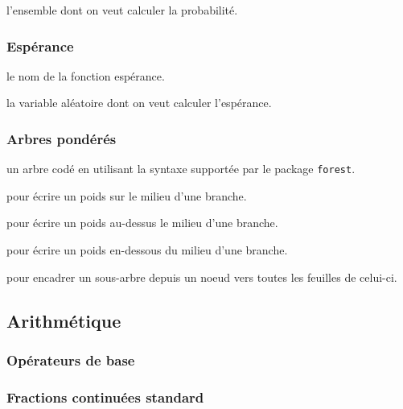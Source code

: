 \documentclass[12pt,a4paper]{article}
\theoremstyle{definition}
\newcommand\extraspace{
	\vspace{0.25em}
}
\begin{document}
 l'ensemble dont on veut calculer la probabilité.





\subsubsection{Espérance}


\IDoption{} le nom de la fonction espérance.

\IDarg{} la variable aléatoire dont on veut calculer l'espérance.
\subsubsection{Arbres pondérés}



\Content{} un arbre codé en utilisant la syntaxe supportée par le package \verb+forest+.

 pour écrire un poids sur le milieu d'une branche.

 pour écrire un poids au-dessus le milieu d'une branche.

 pour écrire un poids en-dessous du milieu d'une branche.

 pour encadrer un sous-arbre depuis un noeud vers toutes les feuilles de celui-ci.
\subsection{Arithmétique}

\subsubsection{Opérateurs de base}



\extraspace

\subsubsection{Fractions continuées standard}


\end{document}
